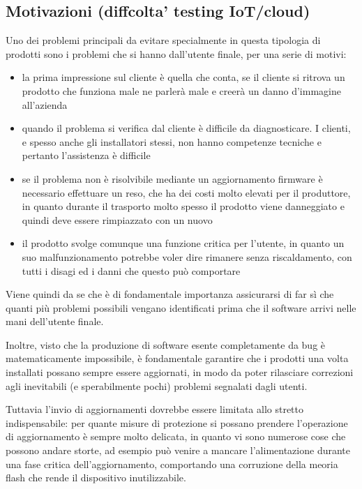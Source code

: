 \documentclass[a4paper,titlepage]{article}
\begin{document}
\subsection{Motivazioni (diffcolta' testing IoT/cloud)}

Uno dei problemi principali da evitare specialmente in questa tipologia di prodotti
sono i problemi che si hanno dall'utente finale, per una serie di motivi:

\begin{itemize}
\item la prima impressione sul cliente è quella che conta, se il cliente si ritrova
    un prodotto che funziona male ne parlerà male e creerà un danno d'immagine all'azienda
\item quando il problema si verifica dal cliente è difficile da diagnosticare. I clienti,
    e spesso anche gli installatori stessi, non hanno competenze tecniche e pertanto l'assistenza è difficile
\item se il problema non è risolvibile mediante un aggiornamento firmware è necessario
    effettuare un reso, che ha dei costi molto elevati per il produttore, in quanto
    durante il trasporto molto spesso il prodotto viene danneggiato e quindi deve essere rimpiazzato con un nuovo
\item il prodotto svolge comunque una funzione critica per l'utente, in quanto un suo
    malfunzionamento potrebbe voler dire rimanere senza riscaldamento, con tutti i disagi
    ed i danni che questo può comportare
\end{itemize}

Viene quindi da se che è di fondamentale importanza assicurarsi di far sì che quanti
più problemi possibili vengano identificati prima che il software arrivi nelle mani
dell'utente finale.

Inoltre, visto che la produzione di software esente completamente da bug
è matematicamente impossibile, è fondamentale garantire che i prodotti una volta
installati possano sempre essere aggiornati, in modo da poter rilasciare correzioni agli
inevitabili (e sperabilmente pochi) problemi segnalati dagli utenti.

Tuttavia l'invio di aggiornamenti dovrebbe essere limitata allo stretto indispensabile:
per quante misure di protezione si possano prendere l'operazione di aggiornamento è sempre
molto delicata, in quanto vi sono numerose cose che possono andare storte, ad esempio
può venire a mancare l'alimentazione durante una fase critica dell'aggiornamento,
comportando una corruzione della meoria flash che rende il dispositivo inutilizzabile.
\end{document}
